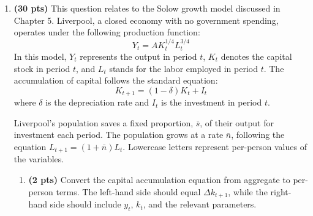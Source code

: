 \documentclass[14pt, oneside]{memoir}
\begin{document}
\begin{enumerate}[label=\textbf{\arabic*.}, itemsep=15pt]
\begin{enumerate}[label=(\alph*)]
	\item Rearrange the formula:
	\[ \bar{A} = \frac{y}{k^{1/3} m^{1/4}}
	\]
	
	Now, the $A_a = 0.976$ and $A_b = 0.55$
	
	
	\item Now, the difference in TFP narrow to 56\% from 40\%. This indicates the TFP now contribute less than before in part b). Part of its previous explanation power went to the difference in quality of institution, which the difference is about 27\%. It is consistent with study that TFP would explain less as we add more variables to the production function.
\end{enumerate}

%

\newpage

\item  \textbf{(30 pts)}\label{P6}  This question relates to the Solow growth model discussed in Chapter 5. Liverpool, a closed economy with no government spending, operates under the following production function:
\[
Y_t = A K_t^{1/4} L_t^{3/4}
\]		
In this model, \(Y_t\) represents the output in period \(t\), \(K_t\) denotes the capital stock in period \(t\), and \(L_t\) stands for the labor employed in period \(t\). The accumulation of capital follows the standard equation:
\[
K_{t+1} = (1 - \delta) K_t + I_t
\]		
where \(\delta\) is the depreciation rate and \(I_t\) is the investment in period \(t\).

Liverpool's population saves a fixed proportion, \(\bar{s}\), of their output for investment each period. The population grows at a rate \(\bar{n}\), following the equation \(L_{t+1} = (1 + \bar{n}) L_t\). Lowercase letters represent per-person values of the variables.

\begin{enumerate}[label=(\alph*)]
	\item \textbf{(2 pts)} Convert the capital accumulation equation from aggregate to per-person terms. The left-hand side should equal \(\Delta k_{t+1}\), while the right-hand side should include \(y_t\), \(k_t\), and the relevant parameters.
	

\end{enumerate}
\end{enumerate}
\end{document}
